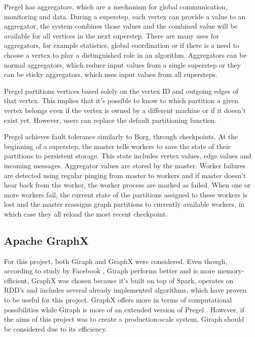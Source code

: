 \documentclass{article}
\theoremstyle{definition}
\begin{document}
Pregel has aggregators, which are a mechanism for global communication, monitoring and data. During a superstep, each vertex can provide a value to an aggregator, the system combines those values and the combined value will be available for all vertices in the next superstep. There are many uses for aggregators, for example statistics, global coordination or if there is a need to choose a vertex to play a distinguished role in an algorithm. Aggregators can be normal aggregators, which reduce input values from a single superstep or they can be sticky aggregators, which uses input values from all supersteps. 

Pregel partitions vertices based solely on the vertex ID and outgoing edges of that vertex. This implies that it's possible to know to which partition a given vertex belongs even if the vertex is owned by a different machine or if it doesn't exist yet. However, users can replace the default partitioning function. 

Pregel achieves fault tolerance similarly to Borg, through checkpoints. At the beginning of a superstep, the master tells workers to save the state of their partitions to persistent storage. This state includes vertex values, edge values and incoming messages. Aggregator values are stored by the master. Worker failures are detected using regular pinging from master to workers and if master doesn't hear back from the worker, the worker process are marked as failed. When one or more workers fail, the current state of the partitions assigned to these workers is lost and the master reassigns graph partitions to currently available workers, in which case they all reload the most recent checkpoint. 

\subsection{Apache GraphX}
For this project, both Giraph \cite{giraph} and GraphX \cite{GraphX} were considered. Even though, according to study by Facebook \cite{fbcase}, Giraph performs better and is more memory-efficient, GraphX was chosen because it's built on top of Spark, operates on RDD's and includes several already implemented algorithms, which have proven to be useful for this project. GraphX offers more in terms of computational possibilities while Giraph is more of an extended version of Pregel \cite{Malewicz2010}. However, if the aims of this project was to create a production-scale system, Giraph should be considered due to its efficiency. \\
\end{document}

